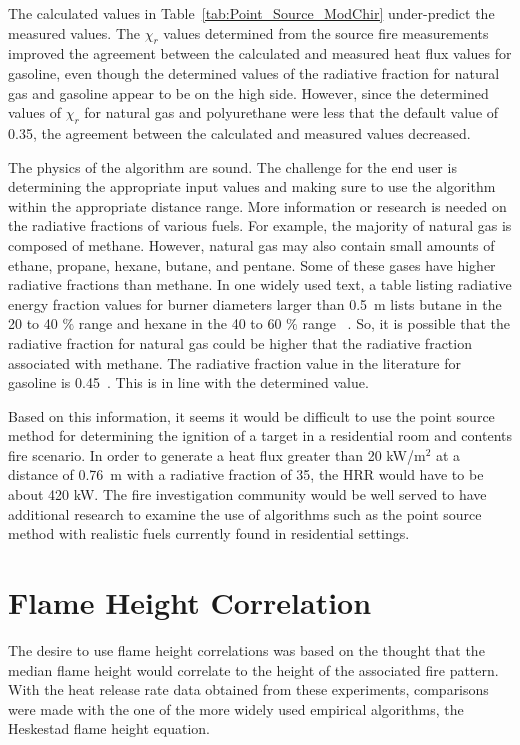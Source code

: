 \documentclass[twoside]{uocthesis}
\begin{document}
{The calculated values in Table~\ref{tab:Point_Source_ModChir} under-predict the measured values.  The $\chi_r$ values determined from the source fire measurements improved the agreement between the calculated and measured heat flux values for gasoline, even though the determined values of the radiative fraction for natural gas and gasoline appear to be on the high side. However, since the determined values of $\chi_r$ for natural gas and polyurethane were less that the default value of 0.35, the agreement between the calculated and measured values decreased.  

The physics of the algorithm are sound.  The challenge for the end user is determining the appropriate input values and making sure to use the algorithm within the appropriate distance range.  More information or research is needed on the radiative fractions of various fuels.  For example, the majority of natural gas is composed of methane.  However, natural gas may also contain small amounts of ethane, propane, hexane, butane, and pentane. Some of these gases have higher radiative fractions than methane. In one widely used text, a table listing radiative energy fraction values for burner diameters larger than 0.5~m lists butane in the 20 to 40 $\%$ range and hexane in the 40 to 60 $\%$ range ~\cite{Quintiere:1997}.  So, it is possible that the radiative fraction for natural gas could be higher that the radiative fraction associated with methane.  The radiative fraction value in the literature for gasoline is 0.45~\cite{Quintiere:1997, IAAI:2017}.  This is in line with the determined value.

Based on this information, it seems it would be difficult to use the point source method for determining the ignition of a target in a residential room and contents fire scenario.  In order to generate a heat flux greater than 20 kW/m$^2$ at a distance of 0.76~m with a radiative fraction of 35, the HRR would have to be about 420 kW.
The fire investigation community would be well served to have additional research to examine the use of algorithms such as the point source method with realistic fuels currently found in residential settings.

\section{Flame Height Correlation}

The desire to use flame height correlations was based on the thought that the median flame height would correlate to the height of the associated fire pattern.  With the heat release rate data obtained from these experiments, comparisons were made with the one of the more widely used empirical algorithms, the Heskestad flame height equation.  

}
\end{document}
